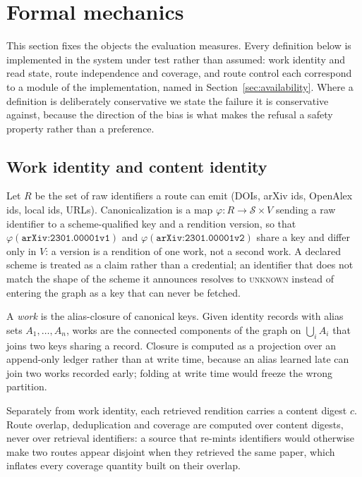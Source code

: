 \section{Formal mechanics}
\label{sec:formalism}

This section fixes the objects the evaluation measures. Every definition below is
implemented in the system under test rather than assumed: work identity and read
state, route independence and coverage, and route control each correspond to a
module of the implementation, named in Section~\ref{sec:availability}. Where a
definition is deliberately conservative we state the failure it is conservative
against, because the direction of the bias is what makes the refusal a safety
property rather than a preference.

\subsection{Work identity and content identity}

Let $R$ be the set of raw identifiers a route can emit (DOIs, arXiv ids,
OpenAlex ids, local ids, URLs). Canonicalization is a map
$\varphi: R \rightarrow \mathcal{S} \times V$ sending a raw identifier to a
scheme-qualified key and a rendition version, so that
$\varphi(\texttt{arXiv:2301.00001v1})$ and $\varphi(\texttt{arXiv:2301.00001v2})$
share a key and differ only in $V$: a version is a rendition of one work, not a
second work. A declared scheme is treated as a claim rather than a credential;
an identifier that does not match the shape of the scheme it announces resolves
to \textsc{unknown} instead of entering the graph as a key that can never be
fetched.

A \emph{work} is the alias-closure of canonical keys. Given identity records
with alias sets $A_1,\dots,A_n$, works are the connected components of the graph
on $\bigcup_i A_i$ that joins two keys sharing a record. Closure is computed as a
projection over an append-only ledger rather than at write time, because an alias
learned late can join two works recorded early; folding at write time would
freeze the wrong partition.

Separately from work identity, each retrieved rendition carries a content digest
$c$. Route overlap, deduplication and coverage are computed over content digests,
never over retrieval identifiers: a source that re-mints identifiers would
otherwise make two routes appear disjoint when they retrieved the same paper,
which inflates every coverage quantity built on their overlap.

